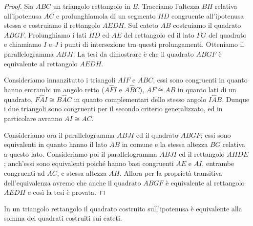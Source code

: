 \noindent\begin{minipage}{0.63\textwidth}\parindent15pt
\begin{proof}
Sia $ABC$ un triangolo rettangolo in $B$. Tracciamo l'altezza $BH$ 
relativa all'ipotenusa $AC$ e prolunghiamola di un segmento $HD$ 
congruente all'ipotenusa stessa e costruiamo il rettangolo $AEDH$. 
Sul cateto $AB$ costruiamo il quadrato $ABGF$. Prolunghiamo i lati 
$HD$ ed $AE$ del rettangolo ed il lato $FG$ del quadrato e chiamiamo 
$I$ e $J$ i punti di intersezione tra questi prolungamenti. Otteniamo 
il parallelogramma $ABJI$.
La tesi da dimostrare è che il quadrato $ABGF$ è equivalente al 
rettangolo $AEDH$.

Consideriamo innanzitutto i triangoli $AIF$ e $ABC$, essi sono 
congruenti in quanto hanno entrambi un angolo retto ($A\widehat{F}I$ 
e $A\widehat{B}C$), $AF\cong AB$ in quanto lati di un quadrato, 
$F\widehat{A}I\cong B\widehat{A}C$ in quanto complementari dello 
stesso angolo $I\widehat{A}B$.
Dunque i due triangoli sono congruenti per il secondo criterio 
generalizzato, ed in particolare avranno $AI\cong AC$.

Consideriamo ora il parallelogramma $ABJI$ ed il quadrato $ABGF$; 
essi sono equivalenti in quanto hanno il lato $AB$ in comune e la 
stessa altezza $BG$ relativa a questo lato. 
Consideriamo poi il parallelogramma $ABJI$ ed il rettangolo $AHDE$; 
anch'essi sono equivalenti poiché hanno basi congruenti $AE$ e $AI$, 
entrambe congruenti ad $AC$, e stessa altezza $AH$.
Allora per la proprietà transitiva dell'equivalenza avremo che anche 
il quadrato $ABGF$ è equivalente al rettangolo $AEDH$ e così la tesi 
è provata.
\end{proof}
\end{minipage}\hfil
\begin{minipage}{0.37\textwidth}
	\centering
\end{minipage}\vspace{8pt}


\begin{teorema}[di Pitagora]
In un triangolo rettangolo il quadrato costruito sull'ipotenusa è 
equivalente alla somma dei quadrati costruiti sui cateti.
\end{teorema}

